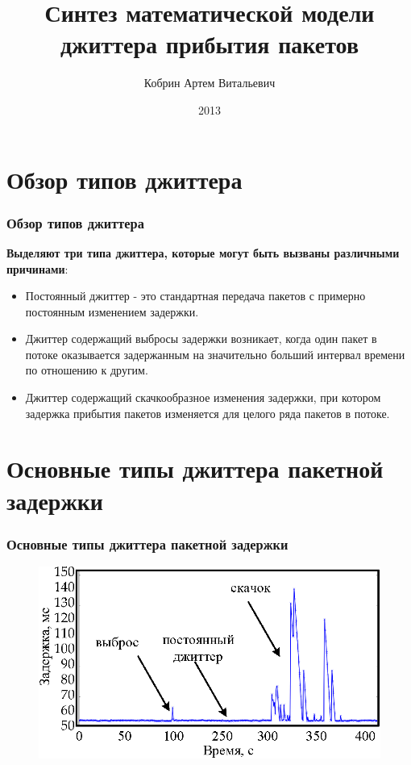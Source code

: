 \documentclass[10pt,pdf,hyperref={unicode}]{beamer}
\title[\theme]{Синтез математической модели \\
джиттера прибытия пакетов}
\author[Кобрин А. В.]{Кобрин Артем Витальевич}
\institute[ХНУРЭ]{Харьковский Национальный Университет Радиоэлектроники\\
	{\tiny Кафедра ТКС}\\
}
\date{2013}
\begin{document}
\begin{frame}
\titlepage
\end{frame}
 
\section{Обзор типов джиттера}

\begin{frame}
\frametitle{Обзор типов джиттера}
    \textbf{Выделяют три типа джиттера, которые могут быть вызваны различными причинами}:
    \begin{itemize}
        \item Постоянный джиттер - это стандартная передача пакетов с примерно постоянным изменением задержки.
        \item Джиттер содержащий выбросы задержки возникает, когда один пакет в потоке оказывается задержанным на значительно больший интервал времени по отношению к другим. 
        \item Джиттер содержащий скачкообразное изменения задержки, при котором задержка прибытия пакетов изменяется для целого ряда пакетов в потоке.
    \end{itemize}

\end{frame}

\section{Основные типы джиттера пакетной задержки}

\begin{frame}
\frametitle{Основные типы джиттера пакетной задержки}
\begin{figure} [!h] 
  \center
\includegraphics{3typeJitter.eps}

  \label{img:3typeJitter}  
\end{figure}

\end{frame}
\end{document}

